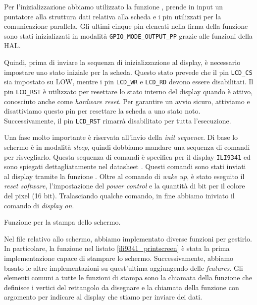\documentclass[a4paper]{article}
\begin{document}
Per l'inizializzazione abbiamo utilizzato la funzione
{},
prende in input un puntatore alla struttura dati relativa alla scheda e i pin utilizzati per la
comunicazione parallela. Gli ultimi cinque pin elencati nella firma della funzione sono stati
inizializzati in modalità \texttt{GPIO\_MODE\_OUTPUT\_PP} grazie alle funzioni della HAL.

Quindi, prima di inviare la sequenza di inizializzazione al display, è necessario impostare
uno stato iniziale per la scheda. Questo stato prevede che il pin \texttt{LCD\_CS} sia
impostato su LOW, mentre i pin \texttt{LCD\_WR} e \texttt{LCD\_RD} devono essere disabilitati.
Il pin \texttt{LCD\_RST} è utilizzato per resettare lo stato interno del display quando è attivo,
conosciuto anche come \textit{hardware reset}. Per garantire un avvio sicuro, attiviamo e
disattiviamo questo pin per resettare la scheda a uno stato noto. Successivamente,
il pin \texttt{LCD\_RST} rimarrà disabilitato per tutta l'esecuzione.

Una fase molto importante è riservata all'invio della \textit{init sequence}.
Di base lo schermo è in modalità \textit{sleep}, quindi dobbiamo mandare una sequenza di
comandi per risvegliarlo. Questa sequenza di comandi è specifica per il display \texttt{ILI9341}
ed sono spiegati dettagliatamente nel datasheet \cite{ili9341}. Questi comandi sono stati
inviati al display tramite la funzione
{}.
Oltre al comando di \textit{wake up}, è stato eseguito il \textit{reset software},
l'impostazione del \textit{power control} e la quantità di bit per il colore del pixel (16 bit).
Tralasciando qualche comando, in fine abbiamo iniviato il comando di \textit{display on}.

\begin{Listing}[h!t] %
    \centering
    \caption{Funzione per la stampa dello schermo.}
    \label{ili9341_printscreen}
\end{Listing}

Nel file relativo allo schermo, abbiamo implementato diverse funzioni per gestirlo.
In particolare, la funzione nel listato \ref{ili9341_printscreen} è stata la prima
implementazione capace di stampare lo schermo. Successivamente, abbiamo basato le altre
implementazioni su quest'ultima aggiungendo delle \textit{features}.
Gli elementi comuni a tutte le funzioni di stampa sono la chiamata della funzione
{} che definisce i vertici
del rettangolo da disegnare e la chiamata della funzione  con argomento
{} per indicare al display
che stiamo per inviare dei dati.
\end{document}
